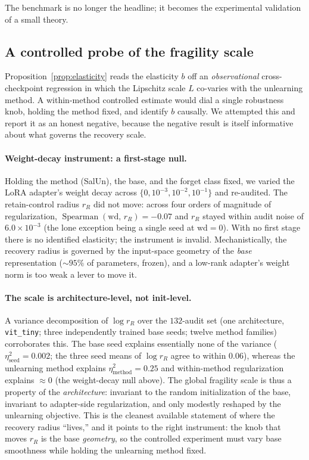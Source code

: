 The benchmark is no longer the headline; it becomes the experimental
validation of a small theory.

\subsection{A controlled probe of the fragility scale}
\label{sec:controlled}

Proposition~\ref{prop:elasticity} reads the elasticity $b$ off an
\emph{observational} cross-checkpoint regression in which the Lipschitz scale
$L$ co-varies with the unlearning method. A within-method controlled estimate
would dial a single robustness knob, holding the method fixed, and identify $b$
causally. We attempted this and report it as an honest negative, because the
negative result is itself informative about what governs the recovery scale.

\paragraph{Weight-decay instrument: a first-stage null.} Holding the method
(SalUn), the base, and the forget class fixed, we varied the LoRA adapter's
weight decay across $\{0,10^{-3},10^{-2},10^{-1}\}$ and re-audited. The
retain-control radius $r_R$ did not move: across four orders of magnitude of
regularization, $\operatorname{Spearman}(\text{wd},\,r_R)=-0.07$ and $r_R$
stayed within audit noise of $6.0\times10^{-3}$ (the lone exception being a
single seed at $\text{wd}=0$). With no first stage there is no identified
elasticity; the instrument is invalid. Mechanistically, the recovery radius is
governed by the input-space geometry of the \emph{base} representation
($\sim\!95\%$ of parameters, frozen), and a low-rank adapter's weight norm is
too weak a lever to move it.

\paragraph{The scale is architecture-level, not init-level.} A variance
decomposition of $\log r_R$ over the $132$-audit set (one architecture,
\texttt{vit\_tiny}; three independently trained base seeds; twelve method
families) corroborates this. The base seed explains essentially none of the
variance ($\eta^2_{\text{seed}}=0.002$; the three seed means of $\log r_R$ agree
to within $0.06$), whereas the unlearning method explains
$\eta^2_{\text{method}}=0.25$ and within-method regularization explains
$\approx\!0$ (the weight-decay null above). The global fragility scale is thus a
property of the \emph{architecture}: invariant to the random initialization of
the base, invariant to adapter-side regularization, and only modestly reshaped
by the unlearning objective. This is the cleanest available statement of where
the recovery radius ``lives,'' and it points to the right instrument: the knob
that moves $r_R$ is the base \emph{geometry}, so the controlled experiment must
vary base smoothness while holding the unlearning method fixed.

